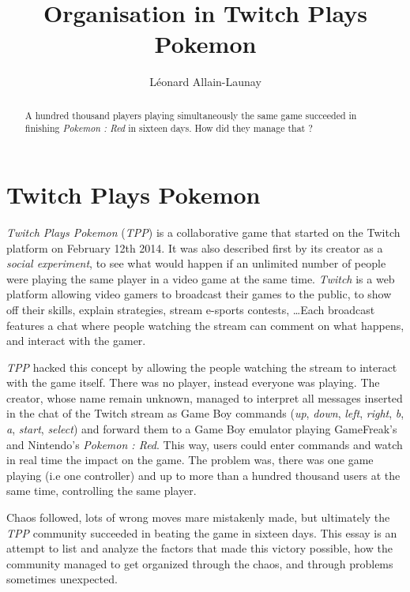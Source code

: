\documentclass[a4paper]{article}
\title{Organisation in Twitch Plays Pokemon}
\author{Léonard Allain-Launay}
\begin{document}
\maketitle

\begin{abstract}
A hundred thousand players playing simultaneously the same game succeeded in finishing \textit{Pokemon : Red} in sixteen days. How did they manage that ?
\end{abstract}

\section{Twitch Plays Pokemon}
\textit{Twitch Plays Pokemon} (\textit{TPP}) is a collaborative game that started on the Twitch platform on February 12th 2014. It was also described first by its creator as a \textit{social experiment}, to see what would happen if an unlimited number of people were playing the same player in a video game at the same time. \textit{Twitch} is a web platform allowing video gamers to broadcast their games to the public, to show off their skills, explain strategies, stream e-sports contests, \dots  Each broadcast features a chat where people watching the stream can comment on what happens, and interact with the gamer.
\newline\par
\textit{TPP} hacked this concept by allowing the people watching the stream to interact with the game itself. There was no player, instead everyone was playing. The creator, whose name remain unknown, managed to interpret all messages inserted in the chat of the Twitch stream as Game Boy commands (\textit{up}, \textit{down}, \textit{left}, \textit{right}, \textit{b}, \textit{a}, \textit{start}, \textit{select}) and forward them to a Game Boy emulator playing GameFreak's and Nintendo's \textit{Pokemon : Red}. This way, users could enter commands and watch in real time the impact on the game. The problem was, there was one game playing (i.e one controller) and up to more than a hundred thousand users at the same time, controlling the same player.
\newline\par
 Chaos followed, lots of wrong moves mare mistakenly made, but ultimately the \textit{TPP} community succeeded in beating the game in sixteen days. This essay is an attempt to list and analyze the factors that made this victory possible, how the community managed to get organized through the chaos, and through problems sometimes unexpected.
 
\end{document}

